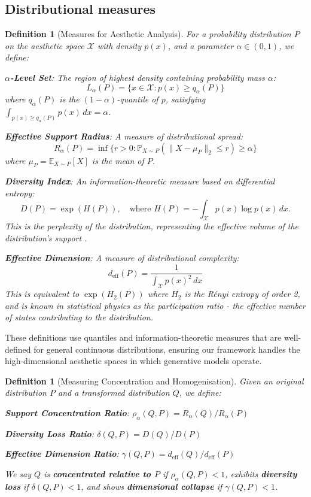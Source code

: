 \documentclass[11pt]{article}
\newtheorem{definition}[theorem]{Definition}
\begin{document}
\subsection{Distributional measures}

\begin{definition}[Measures for Aesthetic Analysis]\label{def:measures}
For a probability distribution $P$ on the aesthetic space $\mathcal{X}$ with density $p(x)$, and a parameter $\alpha \in (0,1)$, we define:

\textbf{$\alpha$-Level Set}: The region of highest density containing probability mass $\alpha$:
$$L_\alpha(P) = \{x \in \mathcal{X} : p(x) \geq q_\alpha(P)\}$$
where $q_\alpha(P)$ is the $(1-\alpha)$-quantile of $p$, satisfying $\int_{p(x) \geq q_\alpha(P)} p(x)\, dx = \alpha$.

\textbf{Effective Support Radius}: A measure of distributional spread:
$$R_\alpha(P) = \inf\{r > 0 : \mathbb{P}_{X \sim P}(\|X - \mu_P\|_2 \leq r) \geq \alpha\}$$
where $\mu_P = \mathbb{E}_{X \sim P}[X]$ is the mean of $P$.

\textbf{Diversity Index}: An information-theoretic measure based on differential entropy:
$$D(P) = \exp(H(P)), \quad \text{where } H(P) = -\int_{\mathcal{X}} p(x) \log p(x)\, dx.$$
This is the \emph{perplexity} of the distribution, representing the effective volume of the distribution's support \citep{Shannon1948}.

\textbf{Effective Dimension}: A measure of distributional complexity:
$$d_{\mathrm{eff}}(P) = \frac{1}{\int_{\mathcal{X}} p(x)^2\, dx}$$
This is equivalent to $\exp(H_2(P))$ where $H_2$ is the R\'{e}nyi entropy of order 2, and is known in statistical physics as the \emph{participation ratio} - the effective number of states contributing to the distribution.
\end{definition}

These definitions use quantiles and information-theoretic measures that are well-defined for general continuous distributions, ensuring our framework handles the high-dimensional aesthetic spaces in which generative models operate.

\begin{definition}[Measuring Concentration and Homogenisation]\label{def:change}
Given an original distribution $P$ and a transformed distribution $Q$, we define:

\textbf{Support Concentration Ratio}: $\rho_\alpha(Q,P) = R_\alpha(Q) / R_\alpha(P)$

\textbf{Diversity Loss Ratio}: $\delta(Q,P) = D(Q) / D(P)$

\textbf{Effective Dimension Ratio}: $\gamma(Q,P) = d_{\mathrm{eff}}(Q) / d_{\mathrm{eff}}(P)$

We say $Q$ is \textbf{concentrated relative to $P$} if $\rho_\alpha(Q,P) < 1$, exhibits \textbf{diversity loss} if $\delta(Q,P) < 1$, and shows \textbf{dimensional collapse} if $\gamma(Q,P) < 1$.
\end{definition}
\end{document}
